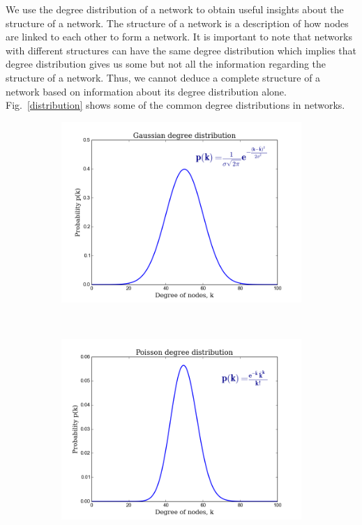 \documentclass[10pt,a4paper]{article}
\begin{document}
We use the degree distribution of a network to obtain useful insights about the structure of a network. The structure of a network is a description of how nodes are linked to each other to form a network. It is important to note that networks with different structures can have the same degree distribution which implies that degree distribution gives us some but not all the information regarding the structure of a network. Thus, we cannot deduce a complete structure of a network based on information about its degree distribution alone. Fig.~\ref{distribution} shows some of the common degree distributions in networks.

\begin{figure}[H]
	\centering
	\begin{subfigure}[b]{0.45\textwidth}
		\includegraphics[width=\textwidth]{images/gaussian.png}
		\caption{}
		\label{gauss}
	\end{subfigure}~ 
	\begin{subfigure}[b]{0.45\textwidth}
		\includegraphics[width=\textwidth]{images/pois.png}

\end{subfigure}
\end{figure}
\end{document}
